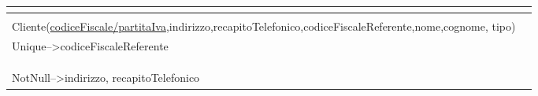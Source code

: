 \documentclass[a4paper,11pt]{report}
\begin{document}
	\begin{table}[]
	\begin{tabularx}{\textwidth}{|l|l|l|l|X}
			\hline
			\multicolumn{4}{|l|}{\cellcolor[HTML]{a3cbf8}{\color[HTML]{000000} \textbf{Cliente}}}                                                               \\ \hline
			\multicolumn{4}{|l|}{}                                                                                                                    \\
			\multicolumn{4}{|l|}{\multirow{-2}{*}{Cliente(\underline{codiceFiscale/partitaIva},indirizzo,recapitoTelefonico,codiceFiscaleReferente,nome,cognome, tipo)}} \\
			\multicolumn{4}{|l|}{Unique--\textgreater codiceFiscaleReferente}                                                                         \\
			\multicolumn{4}{|l|}{}                                                                                                         \\
			\multicolumn{4}{|l|}{}                                                                                                         \\ 
			\multicolumn{4}{|l|}{}                                                                                                       \\             
			\multicolumn{4}{|l|}{\multirow{-6}{*}{NotNull--\textgreater indirizzo, recapitoTelefonico}}                                               \\ \hline
		\end{tabularx}
	\end{table}
\end{document}
